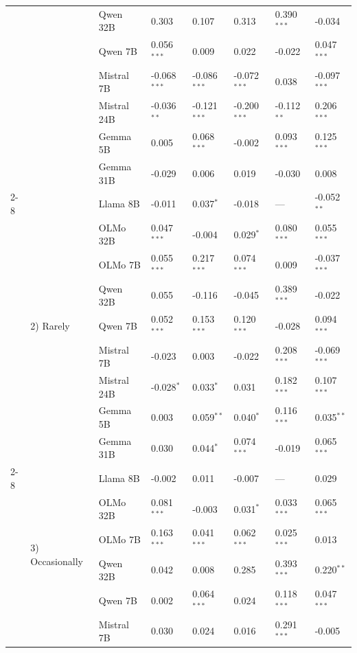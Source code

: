 \begin{longtable}[t]{llllllll}
 &  & Qwen 32B & 0.303 & 0.107 & 0.313 & 0.390$^{***}$ & -0.034 \\
 &  & Qwen 7B & 0.056$^{***}$ & 0.009 & 0.022 & -0.022 & 0.047$^{***}$ \\
 &  & Mistral 7B & -0.068$^{***}$ & -0.086$^{***}$ & -0.072$^{***}$ & 0.038 & -0.097$^{***}$ \\
 &  & Mistral 24B & -0.036$^{**}$ & -0.121$^{***}$ & -0.200$^{***}$ & -0.112$^{**}$ & 0.206$^{***}$ \\
 &  & Gemma 5B & 0.005 & 0.068$^{***}$ & -0.002 & 0.093$^{***}$ & 0.125$^{***}$ \\
 &  & Gemma 31B & -0.029 & 0.006 & 0.019 & -0.030 & 0.008 \\
\cline{2-8}
 & \multirow[t]{9}{*}{2) Rarely} & Llama 8B & -0.011 & 0.037$^{*}$ & -0.018 & --- & -0.052$^{**}$ \\
 &  & OLMo 32B & 0.047$^{***}$ & -0.004 & 0.029$^{*}$ & 0.080$^{***}$ & 0.055$^{***}$ \\
 &  & OLMo 7B & 0.055$^{***}$ & 0.217$^{***}$ & 0.074$^{***}$ & 0.009 & -0.037$^{***}$ \\
 &  & Qwen 32B & 0.055 & -0.116 & -0.045 & 0.389$^{***}$ & -0.022 \\
 &  & Qwen 7B & 0.052$^{***}$ & 0.153$^{***}$ & 0.120$^{***}$ & -0.028 & 0.094$^{***}$ \\
 &  & Mistral 7B & -0.023 & 0.003 & -0.022 & 0.208$^{***}$ & -0.069$^{***}$ \\
 &  & Mistral 24B & -0.028$^{*}$ & 0.033$^{*}$ & 0.031 & 0.182$^{***}$ & 0.107$^{***}$ \\
 &  & Gemma 5B & 0.003 & 0.059$^{**}$ & 0.040$^{*}$ & 0.116$^{***}$ & 0.035$^{**}$ \\
 &  & Gemma 31B & 0.030 & 0.044$^{*}$ & 0.074$^{***}$ & -0.019 & 0.065$^{***}$ \\
\cline{2-8}
 & \multirow[t]{9}{*}{3) Occasionally} & Llama 8B & -0.002 & 0.011 & -0.007 & --- & 0.029 \\
 &  & OLMo 32B & 0.081$^{***}$ & -0.003 & 0.031$^{*}$ & 0.033$^{***}$ & 0.065$^{***}$ \\
 &  & OLMo 7B & 0.163$^{***}$ & 0.041$^{***}$ & 0.062$^{***}$ & 0.025$^{***}$ & 0.013 \\
 &  & Qwen 32B & 0.042 & 0.008 & 0.285 & 0.393$^{***}$ & 0.220$^{**}$ \\
 &  & Qwen 7B & 0.002 & 0.064$^{***}$ & 0.024 & 0.118$^{***}$ & 0.047$^{***}$ \\
 &  & Mistral 7B & 0.030 & 0.024 & 0.016 & 0.291$^{***}$ & -0.005 \\

\end{longtable}
